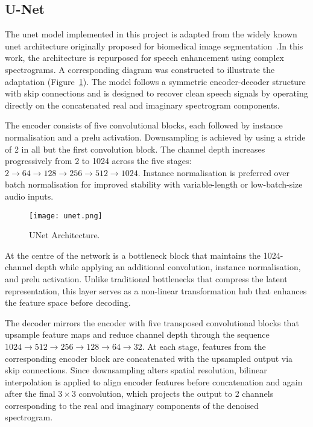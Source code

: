 \subsection{U-Net}
\label{sec:unet}

The \gls{unet} model implemented in this project is adapted from the widely known \gls{unet} architecture originally proposed for biomedical image segmentation~\cite{ronneberger2015unet}.In this work, the architecture is repurposed for speech enhancement using complex spectrograms. A corresponding diagram was constructed to illustrate the adaptation (Figure~\ref{fig:unet}). The model follows a symmetric encoder-decoder structure with skip connections and is designed to recover clean speech signals by operating directly on the concatenated real and imaginary spectrogram components.

The encoder consists of five convolutional blocks, each followed by instance normalisation and a \gls{prelu} activation. Downsampling is achieved by using a stride of 2 in all but the first convolution block. The channel depth increases progressively from 2 to 1024 across the five stages: \(2 \rightarrow 64 \rightarrow 128 \rightarrow 256 \rightarrow 512 \rightarrow 1024\). Instance normalisation is preferred over batch normalisation for improved stability with variable-length or low-batch-size audio inputs.

\begin{figure}[h]
    \centering
    \texttt{[image: unet.png]}
    \caption{\label{fig:unet}UNet Architecture.}
\end{figure}

At the centre of the network is a bottleneck block that maintains the 1024-channel depth while applying an additional convolution, instance normalisation, and \gls{prelu} activation. Unlike traditional bottlenecks that compress the latent representation, this layer serves as a non-linear transformation hub that enhances the feature space before decoding.

The decoder mirrors the encoder with five transposed convolutional blocks that upsample feature maps and reduce channel depth through the sequence \(1024 \rightarrow 512 \rightarrow 256 \rightarrow 128 \rightarrow 64 \rightarrow 32\). At each stage, features from the corresponding encoder block are concatenated with the upsampled output via skip connections. Since downsampling alters spatial resolution, bilinear interpolation is applied to align encoder features before concatenation and again after the final \(3 \times 3\) convolution, which projects the output to 2 channels corresponding to the real and imaginary components of the denoised spectrogram.

